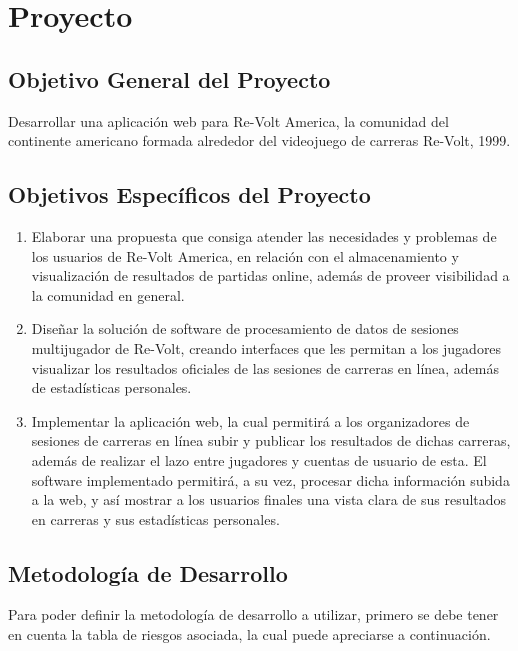 \chapter{Proyecto}

\section{Objetivo General del Proyecto}
Desarrollar una aplicación web para Re-Volt America, la comunidad del continente americano formada alrededor del videojuego de carreras Re-Volt, 1999.

\section{Objetivos Específicos del Proyecto}
\begin{enumerate}
	\item Elaborar una propuesta que consiga atender las necesidades y problemas de los usuarios de Re-Volt America, en relación con el almacenamiento y visualización de resultados de partidas online, además de proveer visibilidad a la comunidad en general.
	\item Diseñar la solución de software de procesamiento de datos de sesiones multijugador de Re-Volt, creando interfaces que les permitan a los jugadores visualizar los resultados oficiales de las sesiones de carreras en línea, además de estadísticas personales.
	\item Implementar la aplicación web, la cual permitirá a los organizadores de sesiones de carreras en línea subir y publicar los resultados de dichas carreras, además de realizar el lazo entre jugadores y cuentas de usuario de esta. El software implementado permitirá, a su vez, procesar dicha información subida a la web, y así mostrar a los usuarios finales una vista clara de sus resultados en carreras y sus estadísticas personales.
\end{enumerate}

\section{Metodología de Desarrollo}
Para poder definir la metodología de desarrollo a utilizar, primero se debe tener en cuenta la tabla de riesgos asociada, la cual puede apreciarse a continuación.

